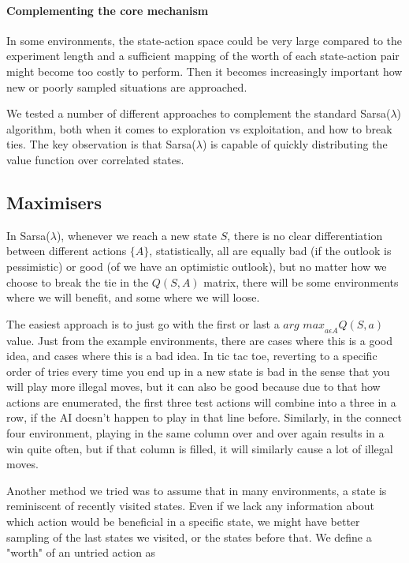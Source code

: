 \paragraph{Complementing the core mechanism}
In some environments, the state-action space could be very large compared to the
experiment length and a sufficient mapping of the worth of each state-action
pair might become too costly to perform. Then it becomes increasingly important
how new or poorly sampled situations are approached.

We tested a number of different approaches to complement the standard
Sarsa($\lambda$) algorithm, both when it comes to exploration vs exploitation,
and how to break ties. The key observation is that Sarsa($\lambda$) is capable
of quickly distributing the value function over correlated states.

\subsection{Maximisers}

In Sarsa($\lambda$), whenever we reach a new state $S$, there is no clear
differentiation between different actions $\{A\}$, statistically, all are
equally bad (if the outlook is pessimistic) or good (of we have an optimistic
outlook), but no matter how we choose to break the tie in the $Q(S,A)$ matrix,
there will be some environments where we will benefit, and some where we will
loose.

The easiest approach is to just go with the first or last a $\textit{arg
    max}_{a\epsilon A} Q(S,a)$ value. Just from the example environments, there
are cases where this is a good idea, and cases where this is a bad idea. In tic
tac toe, reverting to a specific order of tries every time you end up in a new
state is bad in the sense that you will play more illegal moves, but it can also
be good because due to that how actions are enumerated, the first three test
actions will combine into a three in a row, if the AI doesn't happen to play in
that line before. Similarly, in the connect four environment, playing in the
same column over and over again results in a win quite often, but if that column
is filled, it will similarly cause a lot of illegal moves.

Another method we tried was to assume that in many environments, a state is
reminiscent of recently visited states. Even if we lack any information about
which action would be beneficial in a specific state, we might have better
sampling of the last states we visited, or the states before that. We define a
"worth" of an untried action as

